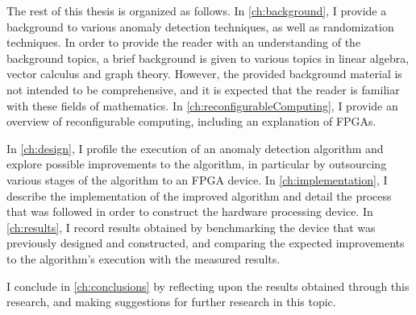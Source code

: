 The rest of this thesis is organized as follows. In \autoref{ch:background}, I
provide a background to various anomaly detection techniques, as well as
randomization techniques. In order to provide the reader with an understanding
of the background topics, a brief background is given to various topics in
linear algebra, vector calculus and graph theory. However, the provided
background material is not intended to be comprehensive, and it is expected that
the reader is familiar with these fields of mathematics. In
\autoref{ch:reconfigurableComputing}, I provide an overview of reconfigurable
computing, including an explanation of \glspl{FPGA}.

In \autoref{ch:design}, I profile the execution of an anomaly detection
algorithm and explore possible improvements to the algorithm, in particular by
outsourcing various stages of the algorithm to an FPGA device. In
\autoref{ch:implementation}, I describe the implementation of the improved
algorithm and detail the process that was followed in order to construct the
hardware processing device. In \autoref{ch:results}, I record results obtained
by benchmarking the device that was previously designed and constructed, and
comparing the expected improvements to the algorithm's execution with the
measured results.

I conclude in \autoref{ch:conclusions} by reflecting upon the results obtained
through this research, and making suggestions for further research in this
topic.
